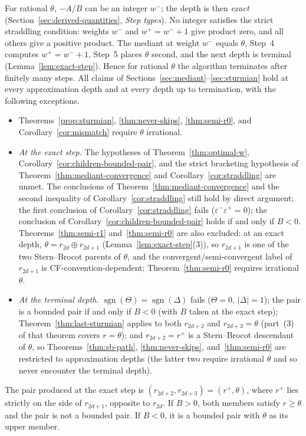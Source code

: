 \documentclass[12pt]{article}
\theoremstyle{definition}
\theoremstyle{remark}
\theoremstyle{plain}
\newcommand{\eps}{\varepsilon}
\newcommand{\Kval}{\Theta}
\newcommand{\Dval}{\Delta}
\newcommand{\wplus}{w^{+}}
\newcommand{\wminus}{w^{-}}
\newcommand{\rplus}{r^{+}}
\newcommand{\epsplus}{\eps^{+}}
\newcommand{\epsminus}{\eps^{-}}
\begin{document}
For rational $\theta$, $-A/B$ can be an integer $\wminus$; the depth is then
\emph{exact} (Section~\ref{sec:derived-quantities}, \emph{Step types}).
No integer satisfies the strict straddling condition: weights $\wminus$ and
$\wplus = \wminus + 1$ give product zero, and all others give a positive product.
The mediant at weight $\wminus$ equals $\theta$, Step~4 computes $\wplus = \wminus + 1$,
Step~5 places $\theta$ second, and the next depth is terminal
(Lemma~\ref{lem:exact-step}).
Hence for rational $\theta$ the algorithm terminates after finitely many steps.
All claims of Sections~\ref{sec:mediant}--\ref{sec:sturmian} hold at every approximation
depth and at every depth up to termination, with the following exceptions.
\begin{itemize}
  \item Theorems~\ref{prop:sturmian}, \ref{thm:never-skips}, \ref{thm:semi-r0},
        and Corollary~\ref{cor:mismatch} require $\theta$ irrational.
  \item \emph{At the exact step.}  The hypotheses of Theorem~\ref{thm:optimal-w},
        Corollary~\ref{cor:children-bounded-pair}, and the strict bracketing hypothesis
        of Theorem~\ref{thm:mediant-convergence} and Corollary~\ref{cor:straddling} are
        unmet.  The conclusions of Theorem~\ref{thm:mediant-convergence} and the second
        inequality of Corollary~\ref{cor:straddling} still hold by direct argument; the
        first conclusion of Corollary~\ref{cor:straddling} fails ($\epsminus\epsplus = 0$);
        the conclusion of Corollary~\ref{cor:children-bounded-pair} holds if and only if
        $B < 0$.
        Theorems~\ref{thm:semi-r1} and~\ref{thm:semi-r0} are also excluded:
        at an exact depth, $\theta = r_{2d} \oplus r_{2d+1}$
        (Lemma~\ref{lem:exact-step}(3)), so $r_{2d+1}$ is one of the two
        Stern--Brocot parents of $\theta$, and the convergent/semi-convergent
        label of $r_{2d+1}$ is CF-convention-dependent;
        Theorem~\ref{thm:semi-r0} requires irrational $\theta$.
  \item \emph{At the terminal depth.}  $\operatorname{sgn}(\Kval) = \operatorname{sgn}(\Dval)$
        fails ($\Kval = 0$, $|\Dval| = 1$); the pair is a bounded pair if and only if
        $B < 0$ (with $B$ taken at the exact step); Theorem~\ref{thm:last-sturmian} applies to both $r_{2d+2}$ and $r_{2d+3} = \theta$
        (part~(3) of that theorem covers $r = \theta$); and $r_{2d+2} = \rplus$ is a Stern--Brocot descendant of $\theta$, so
        Theorems~\ref{thm:sb-path}, \ref{thm:never-skips}, and~\ref{thm:semi-r0}
        are restricted to approximation depths (the latter two require irrational $\theta$
        and so never encounter the terminal depth).
\end{itemize}
The pair produced at the exact step is $(r_{2d+2}, r_{2d+3}) = (\rplus, \theta)$, where
$\rplus$ lies strictly on the side of $r_{2d+1}$, opposite to $r_{2d}$.
If $B > 0$, both members satisfy $r \geq \theta$ and the pair is not a bounded pair.
If $B < 0$, it is a bounded pair with $\theta$ as its upper member.
\end{document}
